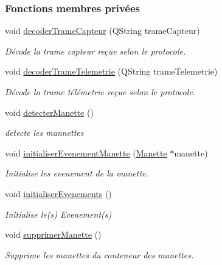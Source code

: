 \subsubsection*{Fonctions membres privées}
\begin{DoxyCompactItemize}
\item 
void \hyperlink{class_rov_ac1780c0484f427807f6207d17b564221}{decoder\+Trame\+Capteur} (Q\+String trame\+Capteur)
\begin{DoxyCompactList}\small\item\em Décode la trame capteur reçue selon le protocole. \end{DoxyCompactList}\item 
void \hyperlink{class_rov_a0d51099f9e1991ceffa0b6ed4a1c4e2e}{decoder\+Trame\+Telemetrie} (Q\+String trame\+Telemetrie)
\begin{DoxyCompactList}\small\item\em Décode la trame télémetrie reçue selon le protocole. \end{DoxyCompactList}\item 
void \hyperlink{class_rov_a53979bc347cda7cc30d18324f2146be1}{detecter\+Manette} ()
\begin{DoxyCompactList}\small\item\em detecte les mannettes \end{DoxyCompactList}\item 
void \hyperlink{class_rov_a0d1863d7d230c0153253d7d2689429b5}{initialiser\+Evenement\+Manette} (\hyperlink{class_manette}{Manette} $\ast$manette)
\begin{DoxyCompactList}\small\item\em Initialise les evenement de la manette. \end{DoxyCompactList}\item 
void \hyperlink{class_rov_a3ba4939b5d1cbd837b9c42869e6b8114}{initialiser\+Evenements} ()
\begin{DoxyCompactList}\small\item\em Initialise le(s) Evenement(s) \end{DoxyCompactList}\item 
void \hyperlink{class_rov_a31f810925200612a6bb4728236c695ed}{supprimer\+Manette} ()
\begin{DoxyCompactList}\small\item\em Supprime les manettes du conteneur des manettes. \end{DoxyCompactList}\end{DoxyCompactItemize}
